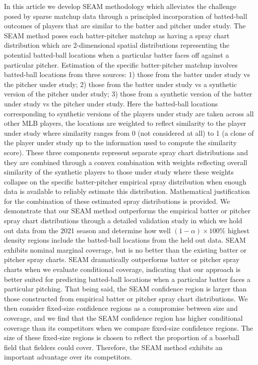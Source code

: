 \documentclass[12pt]{article}
\begin{document}
In this article we develop SEAM methodology which alleviates the challenge posed by sparse matchup data through a principled incorporation of batted-ball outcomes of players that are similar to the batter and pitcher under study. The SEAM method poses each batter-pitcher matchup as having a spray chart distribution which are 2-dimensional spatial distributions representing the potential batted-ball locations when a particular batter faces off against a particular pitcher. %
Estimation of the specific batter-pitcher matchup involves batted-ball locations from three sources: 1) those from the batter under study vs the pitcher under study; 2) those from the batter under study vs a synthetic version of the pitcher under study; 3) those from a synthetic version of the batter under study vs the pitcher under study. Here the batted-ball locations corresponding to synthetic versions of the players under study are taken across all other MLB players, the locations are weighted to reflect similarity to the player under study where similarity ranges from 0 (not considered at all) to 1 (a clone of the player under study up to the information used to compute the similarity score). These three components represent separate spray chart distributions and they are combined through a convex combination with weights reflecting overall similarity of the synthetic players to those under study where these weights collapse on the specific batter-pitcher empirical spray distribution when enough data is available to reliably estimate this distribution. Mathematical justification for the combination of these estimated spray distributions is provided. We demonstrate that our SEAM method outperforms the empirical batter or pitcher spray chart distributions through a detailed validation study in which we hold out data from the 2021 season and determine how well $(1-\alpha)\times 100\%$ highest density regions include the batted-ball locations from the held out data. SEAM exhibits nominal marginal coverage, but is no better than the existing batter or pitcher spray charts. SEAM dramatically outperforms batter or pitcher spray charts when we evaluate conditional coverage, indicating that our approach is better suited for predicting batted-ball locations when a particular batter faces a particular pitching. That being said, the SEAM confidence region is larger than those constructed from empirical batter or pitcher spray chart distributions. We then consider fixed-size confidence regions as a compromise between size and coverage, and we find that the SEAM confidence region has higher conditional coverage than its competitors when we compare fixed-size confidence regions. The size of these fixed-size regions is chosen to reflect the proportion of a baseball field that fielders could cover. Therefore, the SEAM method exhibits an important advantage over its competitors.
\end{document}

